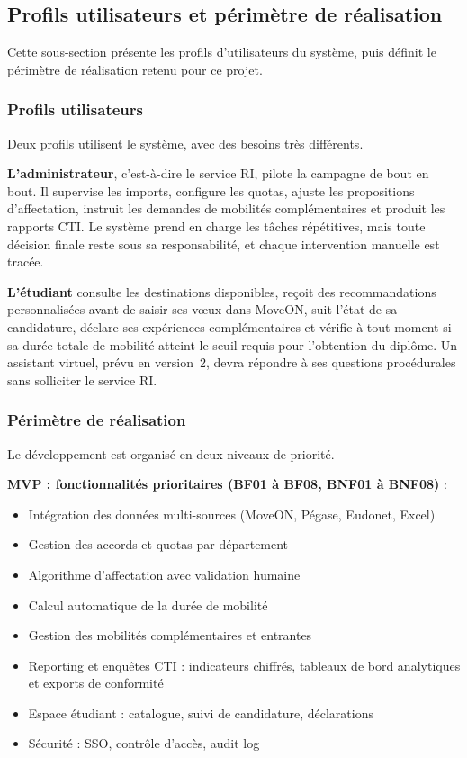 \subsection{Profils utilisateurs et périmètre de réalisation}

Cette sous-section présente les profils d'utilisateurs du système, puis définit le périmètre de réalisation retenu pour ce projet.

\subsubsection{Profils utilisateurs}

Deux profils utilisent le système, avec des besoins très différents.

\textbf{L'administrateur}, c'est-à-dire le service RI, pilote la campagne de bout en bout. Il supervise les imports, configure les quotas, ajuste les propositions d'affectation, instruit les demandes de mobilités complémentaires et produit les rapports CTI. Le système prend en charge les tâches répétitives, mais toute décision finale reste sous sa responsabilité, et chaque intervention manuelle est tracée.

\textbf{L'étudiant} consulte les destinations disponibles, reçoit des recommandations personnalisées avant de saisir ses vœux dans MoveON, suit l'état de sa candidature, déclare ses expériences complémentaires et vérifie à tout moment si sa durée totale de mobilité atteint le seuil requis pour l'obtention du diplôme. Un assistant virtuel, prévu en version~2, devra répondre à ses questions procédurales sans solliciter le service RI.

\subsubsection{Périmètre de réalisation}

Le développement est organisé en deux niveaux de priorité.

\textbf{MVP : fonctionnalités prioritaires (BF01 à BF08, BNF01 à BNF08)} :
\begin{itemize}
  \item Intégration des données multi-sources (MoveON, Pégase, Eudonet, Excel)
  \item Gestion des accords et quotas par département
  \item Algorithme d'affectation avec validation humaine
  \item Calcul automatique de la durée de mobilité
  \item Gestion des mobilités complémentaires et entrantes
  \item Reporting et enquêtes CTI : indicateurs chiffrés, tableaux de bord analytiques et exports de conformité
  \item Espace étudiant : catalogue, suivi de candidature, déclarations
  \item Sécurité : SSO, contrôle d'accès, audit log
\end{itemize}

